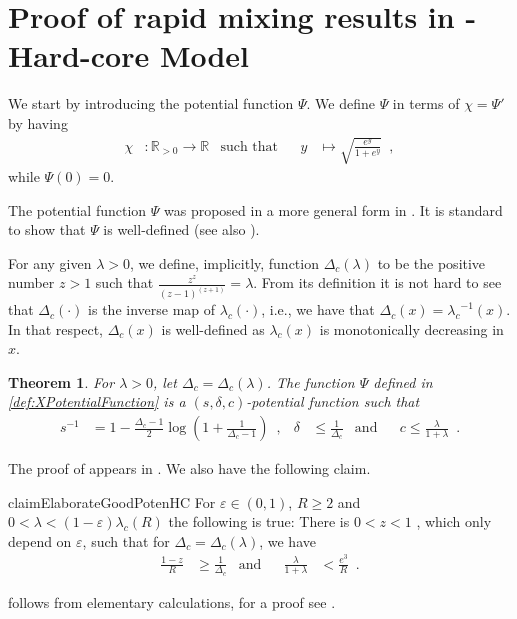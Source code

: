 \documentclass[11pt,reqno]{amsart}
\numberwithin{equation}{section}
\newtheorem{theorem}{Theorem}[section]
\newcommand{\bostonuniversityred}[1]{{\color{bostonuniversityred}#1}}
\newcommand{\cadmiumgreen}[1]{{\color{cadmiumgreen}#1}}
\newcommand{\darkmagenta}[1]{{\color{darkmagenta}#1}}
\newcommand{\red}[1]{{\color{red}#1}}
\newcommand{\dcritical}{{\Delta_c}}
\newcommand{\lcritical}{{\lambda_c}}
\newcommand{\potF}{{\Psi}}
\newcommand{\xdpotF}{\chi}
\newcommand{\pfs}{\darkmagenta{s}}
\newcommand{\spreadpoint}{\newpage}
\renewcommand{\spreadpoint}{}
\renewcommand{\bostonuniversityred}[1]{#1}
\renewcommand{\cadmiumgreen}[1]{#1}
\renewcommand{\darkmagenta}[1]{#1}
\renewcommand{\red}[1]{#1}
\newcommand{\kR}{\bostonuniversityred{R}}%
\newcommand{\kz}{\cadmiumgreen{z}}
\renewcommand{\kR}{R}
\renewcommand{\kz}{z}
\begin{document}
\spreadpoint
 \section{Proof of rapid mixing results in  - Hard-core Model} \label{sec:MainResultsHC}


We start by introducing the potential function
$\potF$. We define $\potF$ in terms of $\xdpotF=\potF'$ by having
{
\begin{align}\label{def:XPotentialFunction}
\xdpotF &: \mathbb{R}_{>0} \to \mathbb{R} & \textrm{such that} && y& \mapsto {\textstyle{\sqrt{\frac{e^y}{1+e^y}} }}  \enspace,
\end{align}
}
while $\potF(0)=0$. 

The potential function $\potF$ was proposed in a more general form in \cite{VigodaSpectralInd}. 
 It is standard to show that $\potF$ is well-defined (see also \cite{VigodaSpectralInd}). 
%



For any given $\lambda>0$, we define, implicitly,  function $\dcritical(\lambda)$ to be the positive 
number $z>1$ such that $\frac{z^{z}}{(z-1)^{(z+1)}}=\lambda$. 
%
From its definition it is not hard to see that $\dcritical(\cdot)$ is the inverse map of $\lcritical(\cdot )$, i.e., we have that 
$\dcritical(x)=\lcritical^{-1}(x)$. In that respect, $\dcritical(x)$ is well-defined as $\lcritical(x)$ is monotonically 
decreasing in $x$. 



\begin{theorem}\label{thrm:GoodPotentialHC}
For $\lambda>0$, let $\dcritical=\dcritical(\lambda)$. The function $\potF$ defined in \eqref{def:XPotentialFunction} is a 
$(\pfs, \delta, c)$-potential function such that 
{
\begin{align}
\pfs^{-1}&= 1-{\textstyle \frac{\dcritical-1}{2}}\log\left(1+\textstyle{\frac{1}{\dcritical-1}} \right) \enspace, 
&\delta& \leq {\textstyle \frac{1}{\dcritical}} &\textrm{and} && c \leq {\textstyle \frac{\lambda}{1+\lambda} }\enspace.
\end{align}
}
\end{theorem}
The proof of  appears in .
We also have the following claim.

\begin{restatable}{claim}{ElaborateGoodPotenHC}\label{claim:InterpretGoodPotentialHC}
For $\varepsilon\in (0,1)$, $\kR \geq 2$ and $0<\lambda<(1-\varepsilon)\lcritical(\kR)$ the following is true: 
There is $0<\kz<1$ , which only depend on $\varepsilon$, such that for $\dcritical=\dcritical(\lambda)$, we have 
{
\begin{align}\label{eq:claim:InterpretGoodPotentialHC}
{\textstyle \frac{1-z}{\kR}} & \geq {\textstyle\frac{1}{\dcritical} }&\textrm{and} && {\textstyle \frac{\lambda}{1+\lambda}} &<\textstyle{\frac{e^3}{\kR} }\enspace. 
\end{align}
}
\end{restatable}
 follows from elementary calculations, 
for a proof see .
\end{document}
